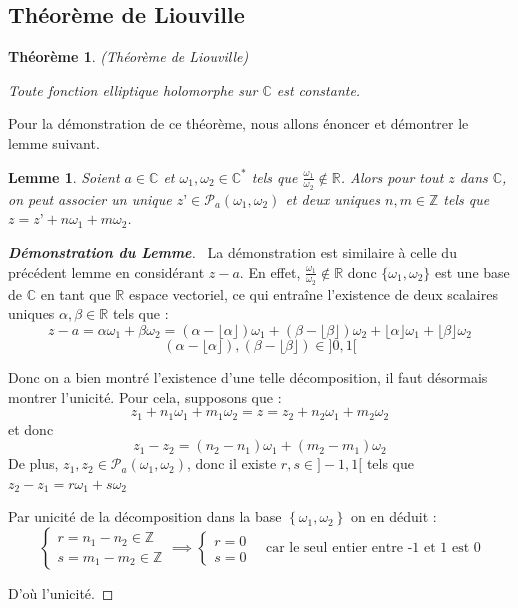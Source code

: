 \documentclass[12pt]{article}
\newtheorem{lemma}{Lemme}
\newtheorem{theorem}{Théorème}
\begin{document}
\subsection{Théorème de Liouville}
\begin{theorem}(Théorème de Liouville)

Toute fonction elliptique holomorphe sur $\mathbb{C}$ est constante.
\end{theorem}
Pour la démonstration de ce théorème, nous allons énoncer et démontrer le lemme suivant.
\begin{lemma}
    Soient $a \in \mathbb{C}$ et $\omega_1, \omega_2 \in \mathbb{C}^{*}$ tels que $\frac{\omega_1}{\omega_2} \notin \mathbb{R}$. Alors pour tout $z$ dans $\mathbb{C}$, on peut associer un unique $z’ \in \mathcal{P}_{a}{(\omega_1, \omega_2)}$ et deux uniques $n, m \in \mathbb{Z}$ tels que $z = z’ + n \omega_1 + m \omega_2$.
\end{lemma}
\begin{proof}[\textbf{Démonstration du Lemme}] \
La démonstration est similaire à celle du précédent lemme en considérant $z-a$.
En effet, $\frac{\omega_1}{\omega_2} \notin \mathbb{R}$ donc $\{ \omega_1, \omega_2 \}$ est une base de $\mathbb{C}$ en tant que $\mathbb{R}$ espace vectoriel, ce qui entraîne l'existence de deux scalaires uniques $\alpha, \beta \in \mathbb{R}$ tels que :
\[
z - a = \alpha \omega_1 + \beta \omega_2 = (\alpha - \lfloor \alpha \rfloor) \omega_1 + (\beta - \lfloor \beta \rfloor) \omega_2 + \lfloor \alpha \rfloor \omega_1 + \lfloor \beta \rfloor \omega_2
\]
\[
    (\alpha - \lfloor \alpha \rfloor), (\beta - \lfloor \beta \rfloor)  \in ]0, 1[
\]

Donc on a bien montré l'existence d'une telle décomposition, il faut désormais montrer l'unicité. Pour cela, supposons que :
\[
z_1 + n_1 \omega_1 + m_1 \omega_2 = z = z_2 + n_2 \omega_1 + m_2 \omega_2
\]
et donc
\[
z_1 - z_2 = (n_2 - n_1) \omega_1 + (m_2 - m_1) \omega_2
\]
De plus, $z_1, z_2 \in \mathcal{P}_{a}(\omega_1, \omega_2)$, donc il existe $r, s \in  ]-1, 1[$ tels que $z_2 - z_1 = r \omega_1 + s \omega_2$

Par unicité de la décomposition dans la base ${\left\{ \omega_1, \omega_2\right\}}$ on en déduit :
\[
\begin{cases}
r = n_1 - n_2 \in \mathbb{Z} \\
s = m_1 - m_2 \in \mathbb{Z}
\end{cases}
\implies
\begin{cases}
r = 0 \\
s = 0
\end{cases}
\quad \text{car le seul entier entre -1 et 1 est 0}
\]

D'où l'unicité.
\end{proof}
\end{document}

